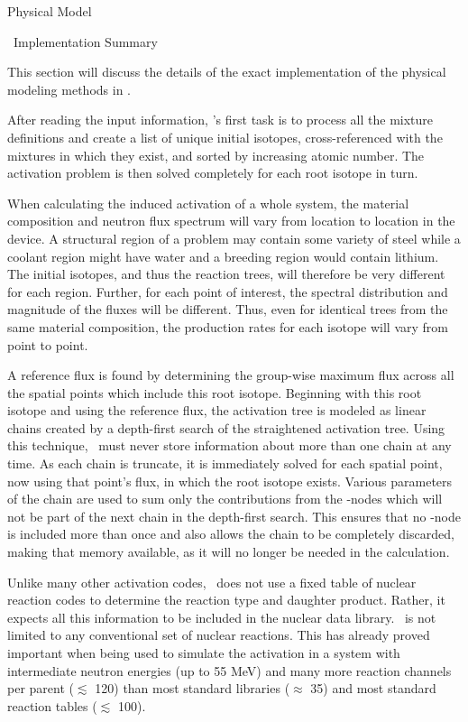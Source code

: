 \begin{chapter}{Physical Model\label{chap:physical}}
\begin{section}{\ALARA\  Implementation Summary\label{sec:physical.alara}}
  
  This section will discuss the details of the exact implementation of
  the physical modeling methods in \ALARA.
  
  After reading the input information, \ALARA's first task is to
  process all the mixture definitions and create a list of unique
  initial isotopes, cross-referenced with the mixtures in which they
  exist, and sorted by increasing atomic number.  The activation
  problem is then solved completely for each root isotope in turn.
  
  When calculating the induced activation of a whole system, the
  material composition and neutron flux spectrum will vary from
  location to location in the device.  A structural region of a
  problem may contain some variety of steel while a coolant region
  might have water and a breeding region would contain lithium.  The
  initial isotopes, and thus the reaction trees, will therefore be
  very different for each region.  Further, for each point of
  interest, the spectral distribution and magnitude of the fluxes will
  be different.  Thus, even for identical trees from the same material
  composition, the production rates for each isotope will vary from
  point to point.
  
  A reference flux is found by determining the group-wise maximum flux
  across all the spatial points which include this root isotope.
  Beginning with this root isotope and using the reference flux, the
  activation tree is modeled as linear chains created by a depth-first
  search of the straightened activation tree.  Using this technique,
  \ALARA\ must never store information about more than one chain at
  any time.  As each chain is truncate, it is immediately solved for
  each spatial point, now using that point's flux, in which the root
  isotope exists.  Various parameters of the chain are used to sum
  only the contributions from the \pc-nodes which will not be part of
  the next chain in the depth-first search.  This ensures that no
  \pc-node is included more than once and also allows the chain to be
  completely discarded, making that memory available, as it will no
  longer be needed in the calculation.
  
  Unlike many other activation codes, \ALARA\ does not use a fixed
  table of nuclear reaction codes to determine the reaction type and
  daughter product.  Rather, it expects all this information to be
  included in the nuclear data library.  \ALARA\ is not limited to any
  conventional set of nuclear reactions.  This has already proved
  important when being used to simulate the activation in a system
  with intermediate neutron energies (up to 55 MeV)\cite{UKA.Thesis}
  and many more reaction channels per parent ($\lesssim$ 120) than
  most standard libraries ($\approx$ 35) and most standard reaction
  tables ($\lesssim$ 100).
  

\end{section}
\end{chapter}

